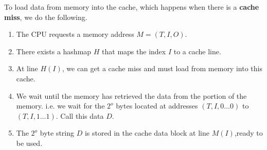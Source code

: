   \begin{theorem}[Placement]
    To load data from memory into the cache, which happens when there is a \textbf{cache miss}, we do the following. 
    \begin{enumerate}
      \item The CPU requests a memory address $M = (T, I, O)$. 
      \item There exists a hashmap $H$ that maps the index $I$ to a cache line. 
      \item At line $H(I)$, we can get a cache miss and must load from memory into this cache. 
      \item We wait until the memory has retrieved the data from the portion of the memory. i.e. we wait for the $2^o$ bytes located at addresses $(T, I, 0\ldots 0)$ to $(T, I, 1\ldots 1)$. Call this data $D$. 
      \item The $2^o$ byte string $D$ is stored in the cache data block at line $M(I)$,ready to be used. 
    \end{enumerate}
  \end{theorem}


